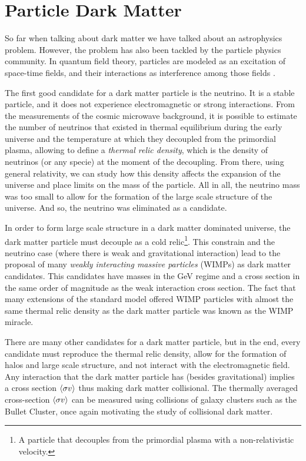 \section{Particle Dark Matter}
So far when talking about dark matter we have talked about an astrophysics problem. However, the problem has also been tackled by the particle physics community. In quantum field theory, particles are modeled as an excitation of space-time fields, and their interactions as interference among those fields \cite{griffiths} \cite{lahiri}.

The first good candidate for a dark matter particle is the neutrino. 
It is a stable particle, and it does not experience electromagnetic or strong interactions\cite{aHistory}. 
From the measurements of the cosmic microwave background, it is possible to estimate the number of neutrinos that existed in thermal equilibrium during the early universe and the temperature at which they decoupled from the primordial plasma, allowing to define a \emph{thermal relic density}, which is the density of neutrinos (or any specie) at the moment of the decoupling. 
From there, using general relativity, we can study how this density affects the expansion of the universe and place limits on the mass of the particle\cite{Gershtein:1966gg}.
All in all, the neutrino mass was too small to allow for the formation of the large scale structure of the universe. And so, the neutrino was eliminated as a candidate. 

In order to form large scale structure in a dark matter dominated universe, the dark matter particle must decouple as a cold relic\footnote{A particle that decouples from the primordial plasma with a non-relativistic velocity.}. This constrain and the neutrino case (where there is weak and gravitational interaction) lead to the proposal of many \emph{weakly interacting massive particles} (WIMPs) as dark matter candidates. This candidates have masses in the GeV regime and a cross section in the same order of magnitude as the weak interaction cross section.  The fact that many extensions of the standard model offered WIMP particles with almost the same thermal relic density as the dark matter particle was known as the WIMP miracle.

There are many other candidates for a dark matter particle, but in the end, every candidate must reproduce the thermal relic density, allow for the formation of halos and large scale structure, and not interact with the electromagnetic field. Any interaction that the dark matter particle has (besides gravitational) implies a cross section $\langle \sigma v \rangle$ thus making dark matter collisional. The thermally averaged cross-section $\langle \sigma v \rangle$ can be measured using collisions of galaxy clusters such as the Bullet Cluster, once again motivating the study of collisional dark matter.


